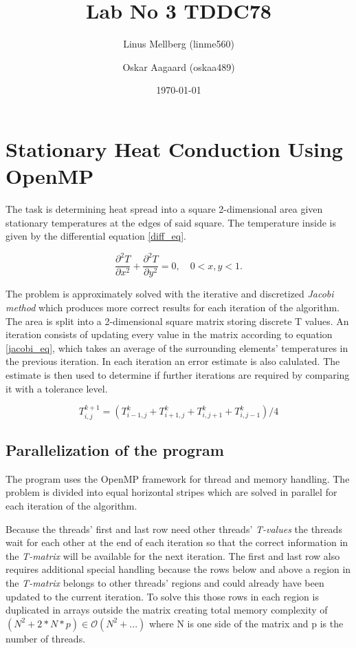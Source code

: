 \documentclass[a4paper,11pt]{article}
\begin{document}
\title{Lab No 3 TDDC78}
\author{Linus Mellberg (linme560) \and Oskar Aagaard (oskaa489)}
\date{\today}
\maketitle
\pagebreak
\thispagestyle{tcr}
\pagestyle{tcr}

\section{Stationary Heat Conduction Using OpenMP}
The task is determining heat spread into a square 2-dimensional area given stationary temperatures at the edges of said square. The temperature inside is given by the differential equation \ref{diff_eq}.

\begin{equation}
\label{diff_eq}
\frac{\partial ^2T}{\partial x^2} + \frac{\partial ^2T}{\partial y^2} = 0,\quad 0<x,y<1.
\end{equation}

The problem is approximately solved with the iterative and discretized \emph{Jacobi method} which produces more correct results for each iteration of the algorithm. The area is split into a 2-dimensional square matrix storing discrete T values. An iteration consists of updating every value in the matrix according to equation \ref{jacobi_eq}, which takes an average of the surrounding elements' temperatures in the previous iteration. In each iteration an error estimate is also calulated. The estimate is then used to determine if further iterations are required by comparing it with a tolerance level.

\begin{equation}
\label{jacobi_eq}
T^{k+1}_{i,j}=\left(T^k_{i-1,j} + T^k_{i+1,j} + T^k_{i,j+1} + T^k_{i,j-1}\right)/4
\end{equation}

\subsection{Parallelization of the program}
The program uses the OpenMP framework for thread and memory handling. The problem is divided into equal horizontal stripes which are solved in parallel for each iteration of the algorithm. 

Because the threads' first and last row need other threads' \emph{T-values} the threads wait for each other at the end of each iteration so that the correct information in the \emph{T-matrix} will be available for the next iteration. The first and last row also requires additional special handling because the rows below and above a region in the \emph{T-matrix} belongs to other threads' regions and could already have been updated to the current iteration. To solve this those rows in each region is duplicated in arrays outside the matrix creating total memory complexity of $\left(N^2+2*N*p\right)\in\mathcal{O}(N^2 + ...)$ where N is one side of the matrix and p is the number of threads.
\end{document}
